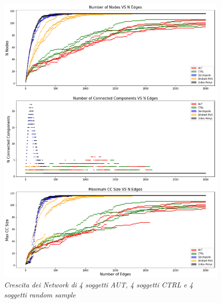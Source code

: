 \documentclass[12pt,openright,a4paper]{article}
\begin{document}
\begin{figure}[!h]
\centering
\includegraphics[scale=0.35]{ALL-Network-growthSMC}
\caption{\textit{Crescita dei Network di 4 soggetti AUT,  4 soggetti CTRL e 4 soggetti random sample}}
\label{ABIDE-ALL}
\end{figure}
\end{document}
